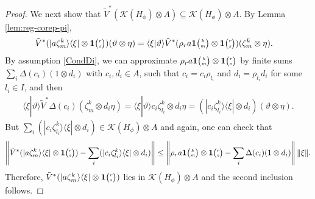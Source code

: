 \begin{proof}
   We next show that $\tilde V^{*}(\mathcal{K}(H_{\phi}) \otimes A)
   \subseteq \mathcal{K}(H_{\phi}) \otimes A$.  By Lemma
   \ref{lem:reg-corep-pi},
   \begin{align*}
     \tilde V^{*}(|a\zeta^{k}_{m}\rangle\langle\xi| \otimes
     \mathbf{1}{\tiny {\begin{pmatrix} r\\s\end{pmatrix}}})(\vartheta\otimes \eta) &=  \langle
     \xi|\vartheta\rangle \tilde V^{*}(\rho_{r}a\mathbf{1}{\tiny {\begin{pmatrix} k\\m\end{pmatrix}}}\otimes
     \mathbf{1}{\tiny {\begin{pmatrix} r\\s\end{pmatrix}}})(\zeta^{k}_{m} \otimes \eta).
   \end{align*}
   By assumption \eqref{CondDi}, we can approximate $\rho_{r}a
   \mathbf{1}{\tiny {\begin{pmatrix} k\\m\end{pmatrix}}}\otimes
   \mathbf{1}{\tiny {\begin{pmatrix} r\\s\end{pmatrix}}}$ by finite sums $\sum_{i} \Delta(c_{i})(1 \otimes d_{i})$ with
   $c_{i}, d_{i} \in A$, such that $c_{i} =c_{i}\rho_{l_{i}}$ and   $d_{i}=\rho_{l_{i}}d_{i}$ for some $l_{i} \in I$, and then
   \begin{align*}
     \langle \xi|\vartheta\rangle \tilde
     V^{*}\Delta(c_{i})(\zeta^{k}_{m}\otimes d_{i}\eta) = \langle
     \xi|\vartheta\rangle c_{i}\zeta^{k}_{l_{i}} \otimes d_{i}\eta =
     (|c_{i}\zeta^{k}_{l_{i}}\rangle\langle\xi| \otimes
     d_{i})(\vartheta\otimes \eta).
   \end{align*}
But $\sum_{i}     (|c_{i}\zeta^{k}_{l_{i}}\rangle\langle\xi| \otimes
     d_{i}) \in \mathcal{K}(H_{\phi}) \otimes A$ and again, one can check   that%
     \begin{align*}
       \left\|      \tilde V^{*}(|a\zeta^{k}_{m}\rangle\langle\xi| \otimes
     \mathbf{1}{\tiny {\begin{pmatrix} r\\s\end{pmatrix}}}) - \sum_{i}     (|c_{i}\zeta^{k}_{l_{i}}\rangle\langle\xi| \otimes
     d_{i})  \right\| \leq \left\|
\rho_{r}a
   \mathbf{1}{\tiny {\begin{pmatrix} k\\m\end{pmatrix}}}\otimes
   \mathbf{1}{\tiny {\begin{pmatrix} r\\s\end{pmatrix}}} - \sum_{i} \Delta(c_{i})(1 \otimes d_{i})
   \right\|\|\xi\|.
     \end{align*}
     Therefore, $   \tilde V^{*}(|a\zeta^{k}_{m}\rangle\langle\xi| \otimes
     \mathbf{1}{\tiny {\begin{pmatrix} r\\s\end{pmatrix}}})$ lies in $\mathcal{K}(H_{\phi}) \otimes A$ and the    second inclusion follows.
\end{proof}
